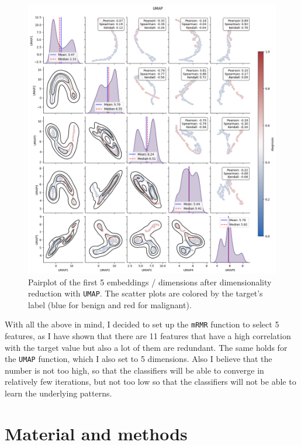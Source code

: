 \documentclass[12pt]{article}
\begin{document}
\begin{figure}[H]
    \centering
    \includegraphics[width=\textwidth]{ims/umap.png}
    \caption{Pairplot of the first 5 embeddings / dimensions after
    dimensionality reduction with \texttt{UMAP}. The scatter plots are colored
    by the target's label (blue for benign and red for malignant).}
    \label{fig:umap}
\end{figure}

With all the above in mind, I decided to set up the \texttt{mRMR} function to
select 5 features, as I have shown that there are 11 features that have a
high correlation with the target value but also a lot of them are redundant.
The same holds for the \texttt{UMAP} function, which I also set to 5 dimensions.
Also I believe that the number is not too high, so that the classifiers will be
able to converge in relatively few iterations, but not too low so that the
classifiers will not be able to learn the underlying patterns.

\section{Material and methods}
\end{document}
